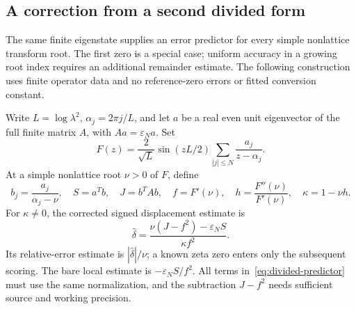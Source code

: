\subsection{A correction from a second divided form}
\label{ssec:dividedcorrection}

The same finite eigenstate supplies an error predictor for every simple
nonlattice transform root. The first zero is a special case; uniform
accuracy in a growing root index requires an additional remainder estimate.
The following construction uses finite operator data and no reference-zero
errors or fitted conversion constant.

Write $L=\log\lambda^2$, $\alpha_j=2\pi j/L$, and let $a$ be a real even
unit eigenvector of the full finite matrix $A$, with $Aa=\varepsilon_N a$.
Set
\[
 F(z)=\frac{2}{\sqrt L}\sin(zL/2)
       \sum_{|j|\le N}\frac{a_j}{z-\alpha_j}.
\]
At a simple nonlattice root $\nu>0$ of $F$, define
\begin{equation}\label{eq:divided-observables}
 b_j=\frac{a_j}{\alpha_j-\nu},\quad
 S=a^Tb,\quad J=b^TAb,\quad f=F'(\nu),\quad
 h=\frac{F''(\nu)}{F'(\nu)},\quad \kappa=1-\nu h.
\end{equation}
For $\kappa\ne0$, the corrected signed displacement estimate is
\begin{equation}\label{eq:divided-predictor}
 \boxed{\widehat\delta=
   \frac{\nu(J-f^2)-\varepsilon_N S}{\kappa f^2}.}
\end{equation}
Its relative-error estimate is $|\widehat\delta|/\nu$; a known zeta zero
enters only the subsequent scoring. The bare local estimate is
$-\varepsilon_NS/f^2$. All terms in~\eqref{eq:divided-predictor} must use
the same normalization, and the subtraction $J-f^2$ needs sufficient
source and working precision.

